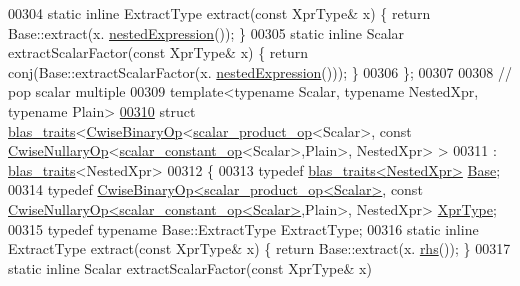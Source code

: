 \begin{DoxyCode}
00304   \textcolor{keyword}{static} \textcolor{keyword}{inline} ExtractType extract(\textcolor{keyword}{const} XprType& x) \{ \textcolor{keywordflow}{return} Base::extract(x.
      \hyperlink{group___core___module_a25d4402be360cf0b8ff867863da46c7d}{nestedExpression}()); \}
00305   \textcolor{keyword}{static} \textcolor{keyword}{inline} Scalar extractScalarFactor(\textcolor{keyword}{const} XprType& x) \{ \textcolor{keywordflow}{return} conj(Base::extractScalarFactor(x.
      \hyperlink{group___core___module_a25d4402be360cf0b8ff867863da46c7d}{nestedExpression}())); \}
00306 \};
00307 
00308 \textcolor{comment}{// pop scalar multiple}
00309 \textcolor{keyword}{template}<\textcolor{keyword}{typename} Scalar, \textcolor{keyword}{typename} NestedXpr, \textcolor{keyword}{typename} Plain>
\hyperlink{struct_eigen_1_1internal_1_1blas__traits_3_01_cwise_binary_op_3_01scalar__product__op_3_01_scala460c90a32ed86eb7afe907bd9f50947d}{00310} \textcolor{keyword}{struct }\hyperlink{struct_eigen_1_1internal_1_1blas__traits}{blas\_traits}<\hyperlink{group___core___module_class_eigen_1_1_cwise_binary_op}{CwiseBinaryOp}<\hyperlink{struct_eigen_1_1internal_1_1scalar__product__op}{scalar\_product\_op}<Scalar>, const 
      \hyperlink{group___core___module_class_eigen_1_1_cwise_nullary_op}{CwiseNullaryOp}<\hyperlink{struct_eigen_1_1internal_1_1scalar__constant__op}{scalar\_constant\_op}<Scalar>,Plain>, NestedXpr> >
00311  : \hyperlink{struct_eigen_1_1internal_1_1blas__traits}{blas\_traits}<NestedXpr>
00312 \{
00313   \textcolor{keyword}{typedef} \hyperlink{struct_eigen_1_1internal_1_1blas__traits}{blas\_traits<NestedXpr>} \hyperlink{struct_eigen_1_1internal_1_1blas__traits}{Base};
00314   \textcolor{keyword}{typedef} \hyperlink{group___core___module_class_eigen_1_1_cwise_binary_op}{CwiseBinaryOp<scalar\_product\_op<Scalar>}, \textcolor{keyword}{const} 
      \hyperlink{group___core___module_class_eigen_1_1_cwise_nullary_op}{CwiseNullaryOp<scalar\_constant\_op<Scalar>},Plain>, NestedXpr> 
      \hyperlink{group___core___module_class_eigen_1_1_cwise_binary_op}{XprType};
00315   \textcolor{keyword}{typedef} \textcolor{keyword}{typename} Base::ExtractType ExtractType;
00316   \textcolor{keyword}{static} \textcolor{keyword}{inline} ExtractType extract(\textcolor{keyword}{const} XprType& x) \{ \textcolor{keywordflow}{return} Base::extract(x.
      \hyperlink{group___core___module_a3a61cbdf6d1adaa62f012045b04b6d09}{rhs}()); \}
00317   \textcolor{keyword}{static} \textcolor{keyword}{inline} Scalar extractScalarFactor(\textcolor{keyword}{const} XprType& x)

\end{DoxyCode}
